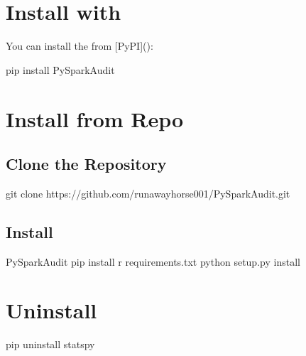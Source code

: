 \documentclass[letterpaper,12pt,english]{sphinxmanual}
\begin{document}
\section{Install with }
\label{\detokenize{install:install-with-pip}}
You can install the  from {[}PyPI{]}():

%
\begin{sphinxVerbatim}[commandchars=\\\{\}]
pip install PySparkAudit
\end{sphinxVerbatim}


\section{Install from Repo}
\label{\detokenize{install:install-from-repo}}

\subsection{Clone the Repository}
\label{\detokenize{install:clone-the-repository}}
%
\begin{sphinxVerbatim}[commandchars=\\\{\}]
git clone https://github.com/runawayhorse001/PySparkAudit.git
\end{sphinxVerbatim}


\subsection{Install}
\label{\detokenize{install:id1}}
%
\begin{sphinxVerbatim}[commandchars=\\\{\}]
 PySparkAudit
pip install \PYGZhy{}r requirements.txt
python setup.py install
\end{sphinxVerbatim}


\section{Uninstall}
\label{\detokenize{install:uninstall}}
%
\begin{sphinxVerbatim}[commandchars=\\\{\}]
pip uninstall statspy
\end{sphinxVerbatim}
\end{document}

